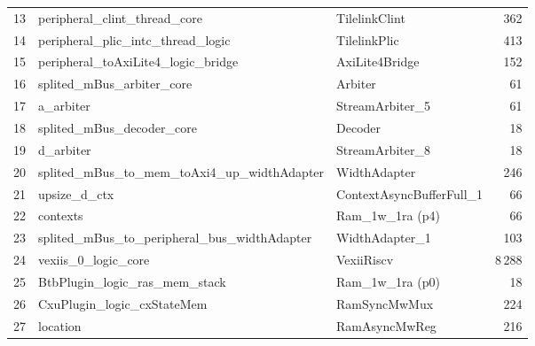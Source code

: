 \begin{table}[!htbp]
\begin{tabular}{rllr}
13 & \quad\quad peripheral\_clint\_thread\_core                          & TilelinkClint                                    &    362 \\
14 & \quad\quad peripheral\_plic\_intc\_thread\_logic                    & TilelinkPlic                                     &    413 \\
15 & \quad\quad peripheral\_toAxiLite4\_logic\_bridge                    & AxiLite4Bridge                                   &    152 \\
16 & \quad\quad splited\_mBus\_arbiter\_core                             & Arbiter                                          &     61 \\
17 & \quad\quad\quad a\_arbiter                                          & StreamArbiter\_5                                 &     61 \\
18 & \quad\quad splited\_mBus\_decoder\_core                             & Decoder                                          &     18 \\
19 & \quad\quad\quad d\_arbiter                                          & StreamArbiter\_8                                 &     18 \\
20 & \quad\quad splited\_mBus\_to\_mem\_toAxi4\_up\_widthAdapter         & WidthAdapter                                     &    246 \\
21 & \quad\quad\quad upsize\_d\_ctx                                      & ContextAsyncBufferFull\_1                        &     66 \\
22 & \quad\quad\quad\quad contexts                                       & Ram\_1w\_1ra (p4)                                &     66 \\
23 & \quad\quad splited\_mBus\_to\_peripheral\_bus\_widthAdapter         & WidthAdapter\_1                                  &    103 \\
24 & \quad\quad vexiis\_0\_logic\_core                                   & VexiiRiscv                                       &  8\,288 \\
25 & \quad\quad\quad BtbPlugin\_logic\_ras\_mem\_stack                   & Ram\_1w\_1ra (p0)                                &     18 \\
26 & \quad\quad\quad CxuPlugin\_logic\_cxStateMem                        & RamSyncMwMux                                     &    224 \\
27 & \quad\quad\quad\quad location                                       & RamAsyncMwReg                                    &    216 \\

\end{tabular}
\end{table}
